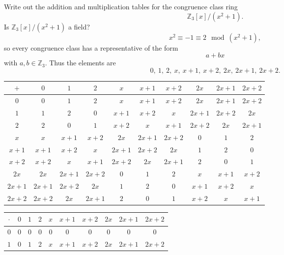 \begin{problem}{
    Write out the addition and multiplication tables for the congruence class ring
    \[
        \mathbb{Z}_3[x]/(x^2+1).
    \]
    Is $\mathbb{Z}_3[x]/(x^2+1)$ a field?
}
    \[
        x^2\equiv -1\equiv 2 \mod (x^2+1),
    \]
    so every congruence class has a representative of the form
    \[
        a+bx
    \]
    with $a,b\in\mathbb{Z}_3$.
    Thus the elements are
    \[
        0,\ 1,\ 2,\ x,\ x+1,\ x+2,\ 2x,\ 2x+1,\ 2x+2.
    \]
    \begin{center}
        \begin{tabular}{|c|c|c|c|c|c|c|c|c|c|}
            \hline
            $+$ & $0$ & $1$ & $2$ & $x$ & $x+1$ & $x+2$ & $2x$ & $2x+1$ & $2x+2$ \\ \hline
            $0$ & $0$ & $1$ & $2$ & $x$ & $x+1$ & $x+2$ & $2x$ & $2x+1$ & $2x+2$ \\ \hline
            $1$ & $1$ & $2$ & $0$ & $x+1$ & $x+2$ & $x$ & $2x+1$ & $2x+2$ & $2x$ \\ \hline
            $2$ & $2$ & $0$ & $1$ & $x+2$ & $x$ & $x+1$ & $2x+2$ & $2x$ & $2x+1$ \\ \hline
            $x$ & $x$ & $x+1$ & $x+2$ & $2x$ & $2x+1$ & $2x+2$ & $0$ & $1$ & $2$ \\ \hline
            $x+1$ & $x+1$ & $x+2$ & $x$ & $2x+1$ & $2x+2$ & $2x$ & $1$ & $2$ & $0$ \\ \hline
            $x+2$ & $x+2$ & $x$ & $x+1$ & $2x+2$ & $2x$ & $2x+1$ & $2$ & $0$ & $1$ \\ \hline
            $2x$ & $2x$ & $2x+1$ & $2x+2$ & $0$ & $1$ & $2$ & $x$ & $x+1$ & $x+2$ \\ \hline
            $2x+1$ & $2x+1$ & $2x+2$ & $2x$ & $1$ & $2$ & $0$ & $x+1$ & $x+2$ & $x$ \\ \hline
            $2x+2$ & $2x+2$ & $2x$ & $2x+1$ & $2$ & $0$ & $1$ & $x+2$ & $x$ & $x+1$ \\ \hline
        \end{tabular}
    \end{center}
    \begin{center}
        \begin{tabular}{|c|c|c|c|c|c|c|c|c|c|}
            \hline
            $\cdot$ & $0$ & $1$ & $2$ & $x$ & $x+1$ & $x+2$ & $2x$ & $2x+1$ & $2x+2$ \\ \hline
            $0$ & $0$ & $0$ & $0$ & $0$ & $0$ & $0$ & $0$ & $0$ & $0$ \\ \hline
            $1$ & $0$ & $1$ & $2$ & $x$ & $x+1$ & $x+2$ & $2x$ & $2x+1$ & $2x+2$ \\ \hline

\end{tabular}
\end{center}
\end{problem}
